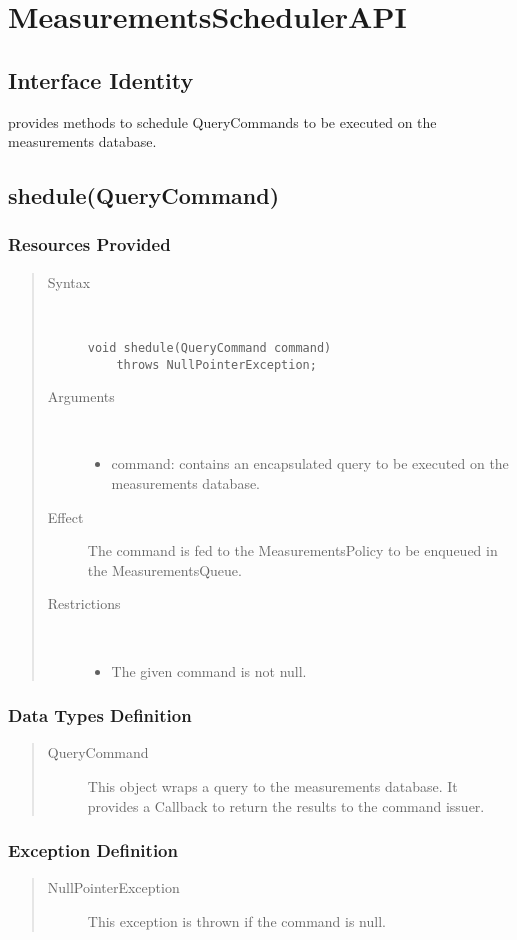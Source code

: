\section{MeasurementsSchedulerAPI}

\subsection{Interface Identity}

\npar {} provides methods to schedule
QueryCommands to be executed on the measurements database.

\subsection{shedule(QueryCommand)}

\subsubsection{Resources Provided}

\begin{quote}
	\begin{description}
		\item[Syntax] \ 
		\begin{verbatim}
void shedule(QueryCommand command)
    throws NullPointerException;
		\end{verbatim}
		\item[Arguments] \
		\begin{itemize}
			\item command: contains an encapsulated query to be executed on the
			measurements database.
		\end{itemize}
		\item[Effect] The command is fed to the MeasurementsPolicy to be enqueued in
		the MeasurementsQueue.
		\item[Restrictions] \ 
		\begin{itemize}
			\item The given command is not null.
		\end{itemize}
	\end{description} 
\end{quote}

\subsubsection{Data Types Definition}

\begin{quote}
	\begin{description}
		\item[QueryCommand] This object wraps a query to the measurements database. It
		provides a Callback to return the results to the command issuer.
	\end{description} 
\end{quote}

\subsubsection{Exception Definition}

\begin{quote}
	\begin{description}
		\item[NullPointerException] This exception is thrown if the command is null.
	\end{description} 
\end{quote}